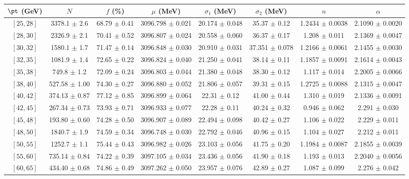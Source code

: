 \begin{tabular}{c||c|c|c|c|c|c|c}
$\pt$ (GeV) & $N$ & $f$ (\%) & $\mu$ (MeV) & $\sigma_1$ (MeV) & $\sigma_2$ (MeV) & $n$ & $\alpha$ \\
\hline
$[25, 28]$ & 3378.1 $\pm$ 2.6 & 68.79 $\pm$ 0.41 & 3096.798 $\pm$ 0.021 & 20.174 $\pm$ 0.048 & 35.37 $\pm$ 0.12 & 1.2434 $\pm$ 0.0038 & 2.1090 $\pm$ 0.0020\\
$[28, 30]$ & 2326.9 $\pm$ 2.1 & 70.41 $\pm$ 0.52 & 3096.807 $\pm$ 0.024 & 20.558 $\pm$ 0.060 & 36.37 $\pm$ 0.17 & 1.208 $\pm$ 0.011 & 2.1369 $\pm$ 0.0047\\
$[30, 32]$ & 1580.1 $\pm$ 1.7 & 71.47 $\pm$ 0.14 & 3096.848 $\pm$ 0.030 & 20.910 $\pm$ 0.031 & 37.351 $\pm$ 0.078 & 1.2166 $\pm$ 0.0061 & 2.1455 $\pm$ 0.0030\\
$[32, 35]$ & 1081.9 $\pm$ 1.4 & 72.65 $\pm$ 0.22 & 3096.824 $\pm$ 0.040 & 21.250 $\pm$ 0.041 & 38.14 $\pm$ 0.11 & 1.1857 $\pm$ 0.0091 & 2.1614 $\pm$ 0.0043\\
$[35, 38]$ & 749.8 $\pm$ 1.2 & 72.09 $\pm$ 0.24 & 3096.803 $\pm$ 0.044 & 21.380 $\pm$ 0.048 & 38.30 $\pm$ 0.12 & 1.117 $\pm$ 0.014 & 2.2005 $\pm$ 0.0066\\
$[38, 40]$ & 527.58 $\pm$ 1.00 & 74.30 $\pm$ 0.27 & 3096.880 $\pm$ 0.052 & 21.806 $\pm$ 0.057 & 39.31 $\pm$ 0.15 & 1.2725 $\pm$ 0.0088 & 2.1315 $\pm$ 0.0047\\
$[40, 42]$ & 374.13 $\pm$ 0.87 & 77.12 $\pm$ 0.85 & 3096.899 $\pm$ 0.064 & 22.31 $\pm$ 0.12 & 41.00 $\pm$ 0.44 & 1.310 $\pm$ 0.019 & 2.1336 $\pm$ 0.0091\\
$[42, 45]$ & 267.34 $\pm$ 0.73 & 73.93 $\pm$ 0.71 & 3096.933 $\pm$ 0.077 & 22.28 $\pm$ 0.11 & 40.24 $\pm$ 0.32 & 0.946 $\pm$ 0.062 & 2.291 $\pm$ 0.030\\
$[45, 48]$ & 193.80 $\pm$ 0.60 & 74.28 $\pm$ 0.50 & 3096.907 $\pm$ 0.089 & 22.494 $\pm$ 0.098 & 40.42 $\pm$ 0.27 & 1.106 $\pm$ 0.022 & 2.229 $\pm$ 0.011\\
$[48, 50]$ & 1840.7 $\pm$ 1.9 & 74.59 $\pm$ 0.34 & 3096.748 $\pm$ 0.030 & 22.792 $\pm$ 0.046 & 40.96 $\pm$ 0.15 & 1.104 $\pm$ 0.027 & 2.212 $\pm$ 0.011\\
$[50, 55]$ & 1252.7 $\pm$ 1.1 & 75.44 $\pm$ 0.43 & 3096.982 $\pm$ 0.026 & 23.103 $\pm$ 0.056 & 41.75 $\pm$ 0.20 & 1.1984 $\pm$ 0.0087 & 2.1855 $\pm$ 0.0039\\
$[55, 60]$ & 735.14 $\pm$ 0.84 & 74.22 $\pm$ 0.39 & 3097.105 $\pm$ 0.034 & 23.436 $\pm$ 0.056 & 41.90 $\pm$ 0.18 & 1.193 $\pm$ 0.013 & 2.2040 $\pm$ 0.0056\\
$[60, 65]$ & 434.40 $\pm$ 0.68 & 74.86 $\pm$ 0.49 & 3097.262 $\pm$ 0.050 & 23.957 $\pm$ 0.076 & 42.89 $\pm$ 0.27 & 1.087 $\pm$ 0.099 & 2.276 $\pm$ 0.042\\

\end{tabular}

